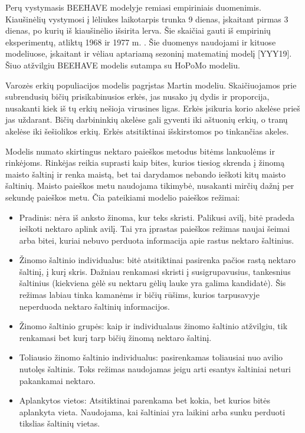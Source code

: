 \documentclass{VUMIFKompMagistrinis}
\begin{document}
Perų vystymasis BEEHAVE modelyje remiasi empiriniais duomenimis. Kiaušinėlių vystymosi į lėliukes laikotarpis trunka 9 dienas, įskaitant pirmas 3 dienas, po kurių iš kiaušinėlio išsirita lerva. Šie skaičiai gauti iš empirinių eksperimentų, atliktų 1968 ir 1977 m. \cite{FuS68, FuO77}. Šie duomenys naudojami ir kituose modeliuose, įskaitant ir vėliau aptariamą sezoninį matematinį modelį [YYY19]. Šiuo atžvilgiu BEEHAVE modelis sutampa su HoPoMo modeliu.


Varozės erkių populiacijos modelis pagrįstas Martin \cite{MAR01} modeliu. Skaičiuojamos prie subrendusių bičių prisikabinusios erkės, jas nusako jų dydis ir proporcija, nusakanti kiek iš tų erkių nešioja virusines ligas. Erkės įsikuria korio akelėse prieš jas uždarant. Bičių darbininkių akelėse gali gyventi iki aštuonių erkių, o tranų akelėse iki šešiolikos erkių. Erkės atsitiktinai išskirstomos po tinkančias akeles. 


Modelis numato skirtingus nektaro paieškos metodus bitėms lankuolėms ir rinkėjoms. Rinkėjas reikia suprasti kaip bites, kurios tiesiog skrenda į žinomą maisto šaltinį ir renka maistą, bet tai darydamos nebando ieškoti kitų maisto šaltinių. Maisto paieškos metu naudojama tikimybė, nusakanti mirčių dažnį per sekundę paieškos metu. Čia pateikiami modelio paieškos režimai:
\begin{itemize}
    \item Pradinis: nėra iš anksto žinoma, kur teks skristi. Palikusi avilį, bitė pradeda ieškoti nektaro aplink avilį. Tai yra įprastas paieškos režimas naujai šeimai arba bitei, kuriai nebuvo perduota informacija apie rastus nektaro šaltinius.
    \item Žinomo šaltinio individualus: bitė atsitiktinai pasirenka pačios rastą nektaro šaltinį, į kurį skris. Dažniau renkamasi skristi į susigrupavusius, tankesnius šaltinius (kiekviena gėlė su nektaru gėlių lauke yra galima kandidatė). Šis režimas labiau tinka kamanėms ir bičių rūšims, kurios tarpusavyje neperduoda nektaro šaltinių informacijos.
    \item Žinomo šaltinio grupės: kaip ir individualaus žinomo šaltinio atžvilgiu, tik renkamasi bet kurį tarp bičių žinomą nektaro šaltinį.
    \item Toliausio žinomo šaltinio individualus: pasirenkamas toliausiai nuo avilio nutolęs šaltinis. Toks režimas naudojamas jeigu arti esantys šaltiniai neturi pakankamai nektaro.
    \item Aplankytos vietos: Atsitiktinai parenkama bet kokia, bet kurios bitės aplankyta vieta. Naudojama, kai šaltiniai  yra laikini arba sunku perduoti tikslias šaltinių vietas.
    
\end{itemize}
\end{document}
